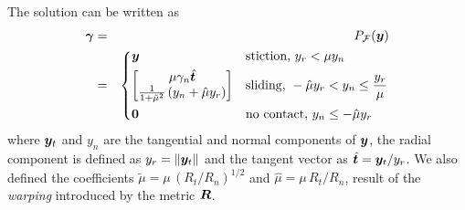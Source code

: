 The solution can be written as
\begin{eqnarray}
	\bgamma &=& P_\mathcal{F}(\vf{y})
    \label{eq:analytical_y_projection}\\
    &=&\begin{dcases}
	\vf{y} 
	& \text{stiction, } y_r < \mu y_n\\
	\begin{bmatrix}
		\mu\gamma_n\hat{\vf{t}}\\
		\frac{1}{1+\tilde\mu^2}\left(y_n +
        \hat\mu y_r\right)
	\end{bmatrix}
	& \text{sliding, } -\hat\mu y_r < y_n \leq \frac{y_r}{\mu}\\
    \vf{0} & \text{no contact, } y_n \leq -\hat\mu y_r
\end{dcases}\nonumber	
\end{eqnarray}
where ${\bm{y}}_t$ and $y_n$ are the tangential and normal components of ${\bm{y}}$,
the radial component is defined as $y_r=\Vert{\bm{y}}_t\Vert$ and the tangent
vector as $\hat{{\bm{t}}}={\bm{y}}_t/y_r$. We also defined the
coefficients $\tilde\mu=\mu\,(R_t/R_n)^{1/2}$ and $\hat\mu=\mu\,R_t/R_n$, result
of the \textit{warping} introduced by the metric ${\bm{R}}$.



